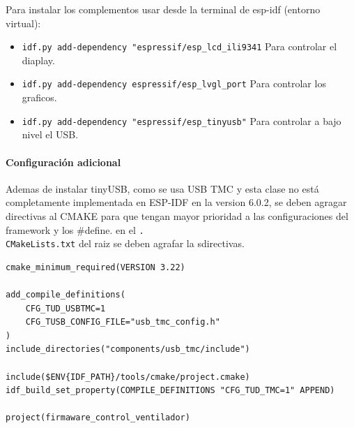 Para instalar los complementos usar desde la terminal de esp-idf (entorno virtual):
\begin{itemize}
    \item \texttt{idf.py add-dependency "espressif/esp_lcd_ili9341} Para controlar el diaplay.
    \item \texttt{idf.py add-dependency espressif/esp_lvgl_port} Para controlar los graficos.
    \item \texttt{idf.py add-dependency "espressif/esp_tinyusb"} Para controlar a bajo nivel el USB.
\end{itemize}

\paragraph{Configuración adicional} Ademas de instalar tinyUSB, como se usa USB TMC y esta clase no está completamente implementada en ESP-IDF en la version 6.0.2, se deben agragar directivas al CMAKE para que tengan mayor prioridad a las configuraciones del framework y los #define. en el \texttt{.\\CMakeLists.txt} del raiz se deben agrafar la sdirectivas.

\begin{verbatim}
cmake_minimum_required(VERSION 3.22)

add_compile_definitions(
    CFG_TUD_USBTMC=1
    CFG_TUSB_CONFIG_FILE="usb_tmc_config.h" 
)
include_directories("components/usb_tmc/include")

include($ENV{IDF_PATH}/tools/cmake/project.cmake)
idf_build_set_property(COMPILE_DEFINITIONS "CFG_TUD_TMC=1" APPEND)

project(firmaware_control_ventilador)
\end{verbatim}
